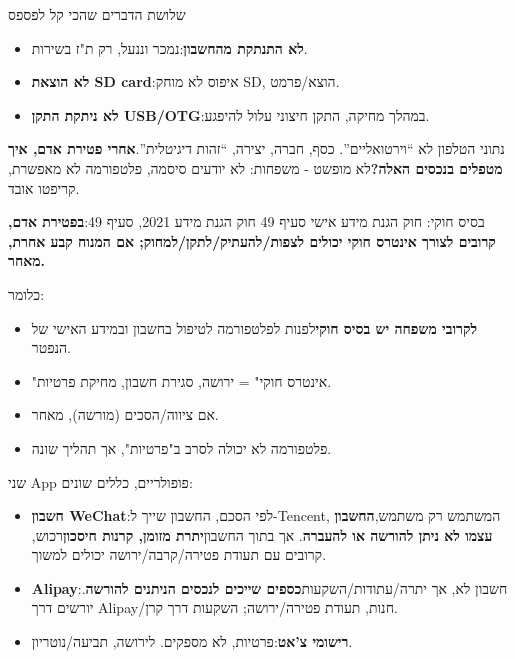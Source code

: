 \begin{tcbwarn}{שלושת הדברים שהכי קל לפספס}
\begin{itemize}
  \item \textbf{לא התנתקת מהחשבון}:נמכר וננעל, רק ת"ז בשירות.
  \item \textbf{לא הוצאת SD card}:איפוס לא מוחק SD, הוצא/פרמט.
  \item \textbf{לא ניתקת התקן USB/OTG}:במהלך מחיקה, התקן חיצוני עלול להיפגע.
\end{itemize}

\end{tcbwarn}


נתוני הטלפון לא “וירטואליים”. כסף, חברה, יצירה, “זהות דיגיטלית”.\textbf{אחרי פטירת אדם, איך מטפלים בנכסים האלה?}לא מופשט - משפחות: לא יודעים סיסמה, פלטפורמה לא מאפשרת, קריפטו אובד.

\begin{tcbinfo}{בסיס חוקי: חוק הגנת מידע אישי סעיף 49}
חוק הגנת מידע 2021, סעיף 49:\textbf{בפטירת אדם, קרובים לצורך אינטרס חוקי יכולים לצפות/להעתיק/לתקן/למחוק; אם המנוח קבע אחרת, מאחר.}

כלומר:

\begin{itemize}
  \item \textbf{לקרובי משפחה יש בסיס חוקי}לפנות לפלטפורמה לטיפול בחשבון ובמידע האישי של הנפטר.
  \item "אינטרס חוקי" = ירושה, סגירת חשבון, מחיקת פרטיות.
  \item אם ציווה/הסכים (מורשה), מאחר.
  \item פלטפורמה לא יכולה לסרב ב"פרטיות", אך תהליך שונה.
\end{itemize}

\end{tcbinfo}


שני App פופולריים, כללים שונים:

\begin{itemize}
  \item \textbf{חשבון WeChat}:לפי הסכם, החשבון שייך ל-Tencent, המשתמש רק משתמש,\textbf{החשבון עצמו לא ניתן להורשה או להעברה}. אך בתוך החשבון\textbf{יתרת מזומן, קרנות חיסכון}רכוש, קרובים עם תעודת פטירה/קרבה/ירושה יכולים למשוך.
  \item \textbf{Alipay}:חשבון לא, אך יתרה/עתודות/השקעות\textbf{כספים שייכים לנכסים הניתנים להורשה}. יורשים דרך Alipay/חנות, תעודת פטירה/ירושה; השקעות דרך קרן.
  \item \textbf{רישומי צ'אט}:פרטיות, לא מספקים. לירושה, תביעה/נוטריון.
\end{itemize}

